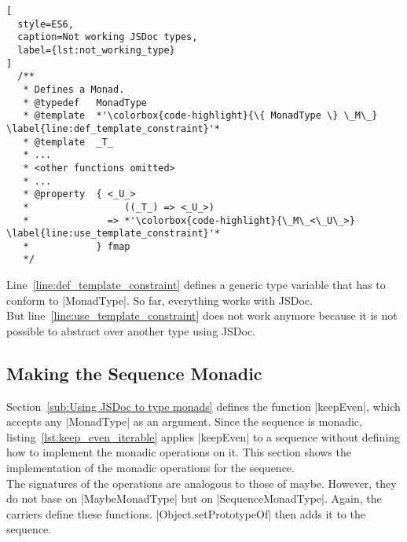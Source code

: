\begin{lstlisting}[
  style=ES6,
  caption=Not working JSDoc types,
  label={lst:not_working_type}
]
  /**
   * Defines a Monad.
   * @typedef   MonadType
   * @template  *'\colorbox{code-highlight}{\{ MonadType \} \_M\_} \label{line:def_template_constraint}'*
   * @template  _T_
   * ...
   * <other functions omitted>
   * ...
   * @property  { <_U_>
   *                 ((_T_) => <_U_>)
   *              => *'\colorbox{code-highlight}{\_M\_<\_U\_>} \label{line:use_template_constraint}'*
   *            } fmap
   */
\end{lstlisting}

Line~\ref{line:def_template_constraint} defines a generic type variable that
has to conform to |MonadType|. So far, everything works with JSDoc.\\ But
line~\ref{line:use_template_constraint} does not work anymore because it is not
possible to abstract over another type using JSDoc.\\

\subsection{Making the Sequence Monadic} %
\label{sub:Making the Sequence Monadic}
Section~\ref{sub:Using JSDoc to type monads} defines the function |keepEven|,
which accepts any |MonadType| as an argument. Since the sequence is monadic,
listing~\ref{lst:keep_even_iterable} applies |keepEven| to a sequence without
defining how to implement the monadic operations on it. This section
shows the implementation of the monadic operations for the sequence.\\
The signatures of the operations are analogous to those of maybe. However,
they do not base on |MaybeMonadType| but on |SequenceMonadType|. Again, the
carriers define these functions. |Object.setPrototypeOf| then adds it to the
sequence.

